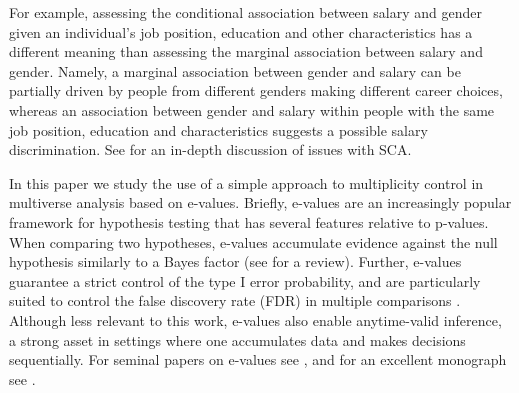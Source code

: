\documentclass[pdflatex,sn-mathphys-num]{sn-jnl}%
\theoremstyle{thmstyleone}%
\theoremstyle{thmstyletwo}%
\theoremstyle{thmstylethree}%
\newcommand{\david}[1]{{\small{\color{blue} \sf $\heartsuit$ [David: #1]}}}
\newcommand{\paul}[1]{{\small{\color{green} \sf $\spadesuit$ Paul: #1}}}
\begin{document}
For example, assessing the conditional association between salary and gender given an individual's job position, education and other characteristics has a different meaning than assessing the marginal association between salary and gender. Namely, a marginal association between gender and salary can be partially driven by people from different genders making different career choices, whereas an association between gender and salary within people with the same job position, education and characteristics suggests a possible salary discrimination. %
See \cite{semken:2022} for an in-depth discussion of issues with SCA.

In this paper we study the use of a simple approach to multiplicity control in multiverse analysis based on e-values. %
Briefly, e-values are an increasingly popular framework for hypothesis testing that has several features relative to p-values. %
When comparing two hypotheses, e-values accumulate evidence against the null hypothesis similarly to a Bayes factor (see \cite{kass_raftery:1995} for a review). Further, e-values guarantee a strict control of the type I error probability, and are particularly suited to control the false discovery rate (FDR) in multiple comparisons \citep{wang_ruodu:2022}. Although less relevant to this work, e-values also enable anytime-valid inference, a strong asset in settings where one accumulates data and makes decisions sequentially. %
For seminal papers on e-values see \cite{vovk:2021,gruenwald:2024,chugg:2026}, and for an excellent monograph see \cite{ramdas:2025}.
\end{document}
